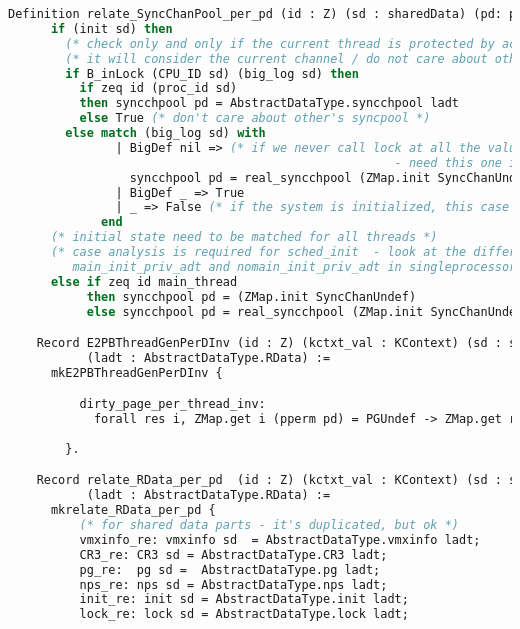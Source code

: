 \begin{lstlisting}[language=Caml]
    Definition relate_SyncChanPool_per_pd (id : Z) (sd : sharedData) (pd: privData) (ladt : AbstractDataType.RData) :=
      if (init sd) then 
        (* check only and only if the current thread is protected by acquire_lock *)
        (* it will consider the current channel / do not care about other channels *)
        if B_inLock (CPU_ID sd) (big_log sd) then 
          if zeq id (proc_id sd) 
          then syncchpool pd = AbstractDataType.syncchpool ladt
          else True (* don't care about other's syncpool *) 
        else match (big_log sd) with 
               | BigDef nil => (* if we never call lock at all the value should be initialized value
                                                      - need this one in sched_init function proof *)
                 syncchpool pd = real_syncchpool (ZMap.init SyncChanUndef)
               | BigDef _ => True
               | _ => False (* if the system is initialized, this case should not happen *)
             end
      (* initial state need to be matched for all threads *)
      (* case analysis is required for sched_init  - look at the difference between 
         main_init_priv_adt and nomain_init_priv_adt in singleprocessor/AuxSingleAbstractData.v file *)
      else if zeq id main_thread  
           then syncchpool pd = (ZMap.init SyncChanUndef)
           else syncchpool pd = real_syncchpool (ZMap.init SyncChanUndef).

    Record E2PBThreadGenPerDInv (id : Z) (kctxt_val : KContext) (sd : sharedData) (pd : privData)
           (ladt : AbstractDataType.RData) :=
      mkE2PBThreadGenPerDInv {

          dirty_page_per_thread_inv:
            forall res i, ZMap.get i (pperm pd) = PGUndef -> ZMap.get res (HP pd) = ZMap.get res (FlatMem.free_page i (HP pd))
          
        }.

    Record relate_RData_per_pd  (id : Z) (kctxt_val : KContext) (sd : sharedData) (pd : privData)
           (ladt : AbstractDataType.RData) :=
      mkrelate_RData_per_pd {
          (* for shared data parts - it's duplicated, but ok *)
          vmxinfo_re: vmxinfo sd  = AbstractDataType.vmxinfo ladt;
          CR3_re: CR3 sd = AbstractDataType.CR3 ladt;
          pg_re:  pg sd =  AbstractDataType.pg ladt;
          nps_re: nps sd = AbstractDataType.nps ladt;
          init_re: init sd = AbstractDataType.init ladt;
          lock_re: lock sd = AbstractDataType.lock ladt;
          

\end{lstlisting}
